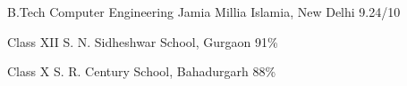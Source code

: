     {B.Tech}
    {Computer Engineering}
    {Jamia Millia Islamia, New Delhi}
    {9.24/10}
    {}

    {Class XII}
    {}
    {S. N. Sidheshwar School, Gurgaon}
    {91\%}
    {}

    {Class X}
    {}
    {S. R. Century School, Bahadurgarh}
    {88\%}
    {}
